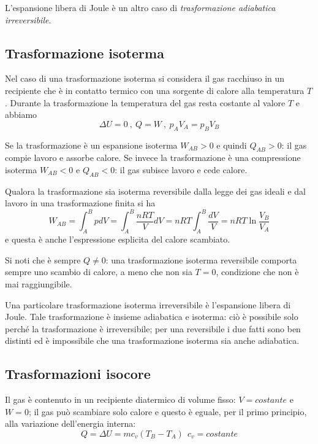 \documentclass[class=book, crop=false, oneside, 12pt]{standalone}
\begin{document}
L'espansione libera di Joule è un altro caso di \emph{trasformazione adiabatica irreversibile}.

\subsection{Trasformazione isoterma}

Nel caso di una trasformazione isoterma si considera il gas racchiuso in un recipiente che è in contatto termico con una sorgente di calore alla temperatura \(T\). 
Durante la trasformazione la temperatura del gas resta costante al valore \(T\) e abbiamo
\begin{equation*}
    \Delta U = 0 \ , \ Q = W \ , \ p_A V_A = p_B V_B
\end{equation*}

Se la trasformazione è un espansione isoterma \(W_{AB}>0\) e quindi \(Q_{AB}>0\): il gas compie lavoro e assorbe calore. 
Se invece la trasformazione è una compressione isoterma \(W_{AB} < 0 \) e \(Q_{AB} < 0\): il gas subisce lavoro e cede calore.

Qualora la trasformazione sia isoterma reversibile dalla legge dei gas ideali e dal lavoro in una trasformazione finita si ha
\begin{equation}
    W_{AB} = \int_A^B p d V = \int_A^B \frac{n R T}{V} d V = n R T \int_A^B \frac{d V}{V} = n R T \ln \frac{V_{B}}{V_{A}} 
\end{equation}
e questa è anche l'espressione esplicita del calore scambiato.

Si noti che è sempre \(Q \neq 0\): una trasformazione isoterma reversibile comporta sempre uno scambio di calore, a meno che non sia \(T = 0\), condizione che non è mai raggiungibile. 

Una particolare trasformazione isoterma irreversibile è l'espansione libera di Joule. 
Tale trasformazione è insieme adiabatica e isoterma: ciò è possibile solo perché la trasformazione è irreversibile; per una reversibile i due fatti sono ben distinti ed è impossibile che una trasformazione isoterma sia anche adiabatica.

\subsection{Trasformazioni isocore}

Il gas è contenuto in un recipiente diatermico di volume fisso: \(V = costante\) e \(W = 0\); il gas può scambiare solo calore e questo è eguale, per il primo principio, alla variazione dell'energia interna:
\begin{equation*}
    Q = \Delta U = m c_v (T_B - T_A) \ \  c_v = costante
\end{equation*}
\end{document}

